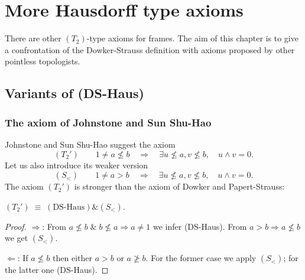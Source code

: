 \chapter{More Hausdorff type axioms}

There are other $(T_2)$-type axioms for frames.
The aim of this chapter is to give a confrontation of the Dowker-Strauss
definition with axioms proposed by other pointless topologists.

\section{Variants of (DS-Haus)}

\subsection{The axiom of Johnstone and Sun Shu-Hao}

Johnstone and Sun Shu-Hao \cite{johnstone-shu-hao} suggest the axiom
\[
  (T_2') \qquad
  1 \ne a\not\le b \quad \Rightarrow \quad \exists u\not\leq a, v\not\leq b,
  \quad u \wedge v = 0.
\]
Let us also introduce its weaker version
\[
  (S_<) \qquad
  1 \ne a > b \quad \Rightarrow \quad \exists u\not\leq a, v\not\leq b,
  \quad u \wedge v = 0.
\]
The axiom $(T_2')$ is stronger than the axiom of Dowker and Papert-Strauss:
\begin{prop} \label{prop:T2'=DS-Haus+S<}
  $(T_2') \; \equiv \; (\text{DS-Haus}) \& (S_<)$.
\end{prop}
\begin{proof}
  $\Rightarrow$:
  From $a\not\le b \; \& \;  b\not\le a \Rightarrow a \ne 1$ we infer
  (DS-Haus).
  From $a > b \Rightarrow a \not\le b$ we get $(S_<)$.

  $\Leftarrow$:
  If $a \not\le b$ then either $a > b$ or $a\not\ge b$.
  For the former case we apply $(S_<)$; for the latter one (DS-Haus).
\end{proof}

